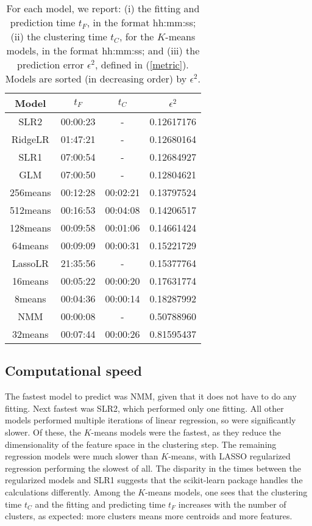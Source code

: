 \documentclass{article} %
\begin{document}
\begin{table}[htbp]
\small
   \centering
   \begin{tabular}{@{}|c|c|c|c|@{}} %
  \cline{1-4}
Model & $t_F$ & $t_C$ & $\epsilon^2$ \\ \hline
\hline
SLR2 & 00:00:23 & - & 0.12617176 \\ \hline
RidgeLR & 01:47:21 & - & 0.12680164 \\ \hline
SLR1 & 07:00:54 & - & 0.12684927 \\ \hline
GLM & 07:00:50 & - & 0.12804621 \\ \hline
256means & 00:12:28 & 00:02:21 & 0.13797524 \\ \hline
512means & 00:16:53 & 00:04:08 & 0.14206517 \\ \hline
128means & 00:09:58 & 00:01:06 & 0.14661424 \\ \hline
64means & 00:09:09 & 00:00:31 & 0.15221729 \\ \hline
LassoLR & 21:35:56 & - & 0.15377764 \\ \hline
16means & 00:05:22 & 00:00:20 & 0.17631774 \\ \hline
8means & 00:04:36 & 00:00:14 & 0.18287992 \\ \hline
NMM & 00:00:08 & - & 0.50788960 \\ \hline
32means & 00:07:44 & 00:00:26 & 0.81595437 \\ \hline
   \end{tabular}
   \caption{For each model, we report: (i) the fitting and prediction time $t_F$, in the format hh:mm:ss; (ii) the clustering time $t_C$, for the $K$-means models, in the format hh:mm:ss; and (iii) the prediction error $\epsilon^2$, defined in (\ref{metric}). Models are sorted (in decreasing order) by $\epsilon^2$.}
   \label{tab:models}
\end{table}

\subsection{Computational speed}
The fastest model to predict was NMM, given that it does not have to do any fitting. Next fastest was SLR2, which performed only one fitting. All other models performed multiple iterations of linear regression, so were significantly slower. Of these, the $K$-means models were the fastest, as they reduce the dimensionality of the feature space in the clustering step. The remaining regression models were much slower than $K$-means, with LASSO regularized regression performing the slowest of all. The disparity in the times between the regularized models and SLR1 suggests that the scikit-learn package handles the calculations differently. Among the $K$-means models, one sees that the clustering time $t_C$ and the fitting and predicting time $t_F$ increases with the number of clusters, as expected: more clusters means more centroids and more features.
\end{document}

